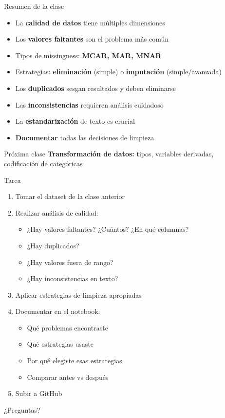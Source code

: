 \documentclass[aspectratio=169]{beamer}
\begin{document}
\begin{frame}{Resumen de la clase}
\begin{itemize}
    \item La \textbf{calidad de datos} tiene múltiples dimensiones
    \item Los \textbf{valores faltantes} son el problema más común
    \item Tipos de missingness: \textbf{MCAR, MAR, MNAR}
    \item Estrategias: \textbf{eliminación} (simple) o \textbf{imputación} (simple/avanzada)
    \item Los \textbf{duplicados} sesgan resultados y deben eliminarse
    \item Las \textbf{inconsistencias} requieren análisis cuidadoso
    \item La \textbf{estandarización} de texto es crucial
    \item \textbf{Documentar} todas las decisiones de limpieza
\end{itemize}

\vspace{1em}

\begin{block}{Próxima clase}
\textbf{Transformación de datos:} tipos, variables derivadas, codificación de categóricas
\end{block}
\end{frame}

\begin{frame}{Tarea}
\begin{enumerate}
    \item Tomar el dataset de la clase anterior
    \item Realizar análisis de calidad:
    \begin{itemize}
        \item ¿Hay valores faltantes? ¿Cuántos? ¿En qué columnas?
        \item ¿Hay duplicados?
        \item ¿Hay valores fuera de rango?
        \item ¿Hay inconsistencias en texto?
    \end{itemize}
    \item Aplicar estrategias de limpieza apropiadas
    \item Documentar en el notebook:
    \begin{itemize}
        \item Qué problemas encontraste
        \item Qué estrategias usaste
        \item Por qué elegiste esas estrategias
        \item Comparar antes vs después
    \end{itemize}
    \item Subir a GitHub
\end{enumerate}
\end{frame}

\begin{frame}[standout]
\Huge ¿Preguntas?
\end{frame}
\end{document}
